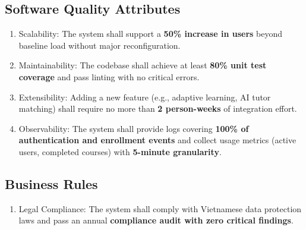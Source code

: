 \subsection{Software Quality Attributes}
\begin{enumerate}[label=NFR\arabic*:, start=12, leftmargin=2.5cm]
  \item Scalability: The system shall support a \textbf{50\% increase in users} beyond baseline load without major reconfiguration.
  \item Maintainability: The codebase shall achieve at least \textbf{80\% unit test coverage} and pass linting with no critical errors.
  \item Extensibility: Adding a new feature (e.g., adaptive learning, AI tutor matching) shall require no more than \textbf{2 person-weeks} of integration effort.
  \item Observability: The system shall provide logs covering \textbf{100\% of authentication and enrollment events} and collect usage metrics (active users, completed courses) with \textbf{5-minute granularity}.
\end{enumerate}

\subsection{Business Rules}
\begin{enumerate}[label=NFR\arabic*:, start=16, leftmargin=2.5cm]
  \item Legal Compliance: The system shall comply with Vietnamese data protection laws and pass an annual \textbf{compliance audit with zero critical findings}.
\end{enumerate}
